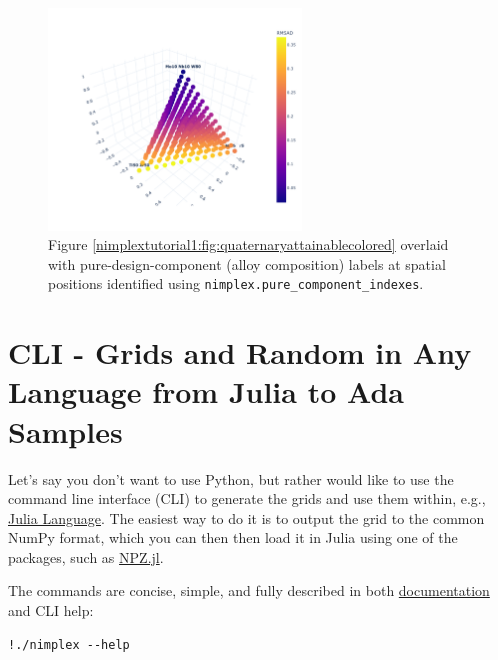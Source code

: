 \begin{figure}[H]
    \centering
    \includegraphics[width=0.6\textwidth]{nimplexTutorial1/01.QuickStart_51_0.pdf}
    \caption{Figure \ref{nimplextutorial1:fig:quaternaryattainablecolored} overlaid with pure-design-component (alloy composition) labels at spatial positions identified using \texttt{nimplex.pure\_component\_indexes}.}
    \label{nimplextutorial1:fig:quaternaryattainablecoloredlabel}
\end{figure}

\section{CLI - Grids and Random in Any Language from Julia to Ada
Samples} 
\label{nimplextutorial1:cli---grids-and-random-samples}

Let's say you don't want to use Python, but rather would like to use the
command line interface (CLI) to generate the grids and use them within,
e.g., \href{https://julialang.org}{Julia Language}. The easiest way to
do it is to output the grid to the common NumPy format, which you can
then then load it in Julia using one of the packages, such as
\href{https://www.juliapackages.com/p/npz}{NPZ.jl}.

The commands are concise, simple, and fully described in both
\href{https://amkrajewski.github.io/nimplex/}{documentation} and CLI
help:

\begin{verbatim}
!./nimplex --help
\end{verbatim}

